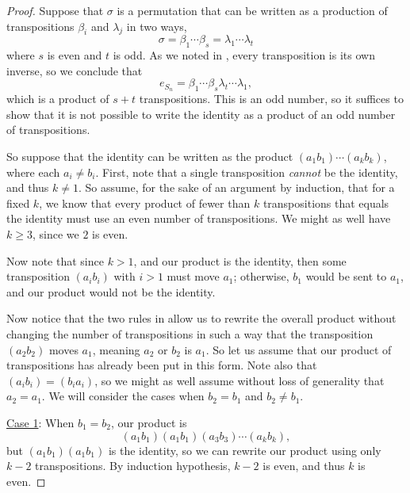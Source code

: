 \documentclass[12pt]{report}
\numberwithin{equation}{section}
\numberwithin{theorem}{chapter}
\theoremstyle{definition}
\newtheorem*{basic properties}{Basic Properties}
\newtheorem*{Important Remark}{Important Remark}
\begin{document}
\begin{proof}
Suppose that $\sigma$ is a permutation that can be written as a production of transpositions $\beta_i$ and $\lambda_j$ in two ways,
$$\sigma = \beta_1 \cdots \beta_s = \lambda_1 \cdots \lambda_t$$
where $s$ is even and $t$ is odd. As we noted in , every transposition is its own inverse, so we conclude that
$$e_{S_n} = \beta_1 \cdots \beta_s \lambda_t \cdots \lambda_1,$$
which is a product of $s+t$ transpositions. This is an odd number, so it suffices to show that it is not possible to write the identity as a product of an odd number of transpositions.

So suppose that the identity can be written as the product $(a_1 b_1) \cdots (a_k b_k)$, where each $a_i \neq b_i$. First, note that a single transposition \emph{cannot} be the identity, and thus $k \neq 1$. So assume, for the sake of an argument by induction, that for a fixed $k$, we know that every product of fewer than $k$ transpositions that equals the identity must use an even number of transpositions. We might as well have $k \geqslant 3$, since we $2$ is even.

Now note that since $k > 1$, and our product is the identity, then some transposition $(a_i b_i)$ with $i > 1$ must move $a_1$; otherwise, $b_1$ would be sent to $a_1$, and our product would not be the identity. 

Now notice that the two rules in  allow us to rewrite the overall product without changing the number of transpositions in such a way that the transposition $(a_2 b_2)$ moves $a_1$, meaning $a_2$ or $b_2$ is $a_1$. So let us assume that our product of transpositions has already been put in this form. Note also that $(a_i b_i) = (b_i a_i)$, so we might as well assume without loss of generality that $a_2 = a_1$. We will consider the cases when $b_2 =b_1$ and $b_2 \neq b_1$.

\underline{Case 1}: When $b_1 = b_2$, our product is
$$(a_1 b_1) (a_1 b_1) (a_3 b_3) \cdots (a_k b_k),$$
but $(a_1 b_1) (a_1 b_1)$ is the identity, so we can rewrite our product using only $k-2$ transpositions. By induction hypothesis, $k-2$ is even, and thus $k$ is even.


\end{proof}
\end{document}
